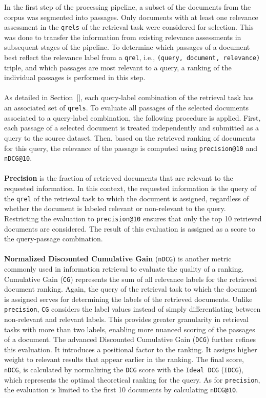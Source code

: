 In the first step of the processing pipeline, a subset of the documents from the corpus was segmented into passages. Only documents with at least one relevance assessment in the \texttt{qrels} of the retrieval task were considered for selection. This was done to transfer the information from existing relevance assessments in subsequent stages of the pipeline. To determine which passages of a document best reflect the relevance label from a \texttt{qrel}, i.e., \texttt{(query, document, relevance)} triple, and which passages are most relevant to a query, a ranking of the individual passages is performed in this step.
\\\\
As detailed in Section~[], each query-label combination of the retrieval task has an associated set of \texttt{qrels}. To evaluate all passages of the selected documents associated to a query-label combination, the following procedure is applied. First, each passage of a selected document is treated independently and submitted as a query to the source dataset. Then, based on the retrieved ranking of documents for this query, the relevance of the passage is computed using \texttt{precision@10} and \texttt{nDCG@10}.
\\\\
\textbf{Precision} is the fraction of retrieved documents that are relevant to the requested information. In this context, the requested information is the query of the \texttt{qrel} of the retrieval task to which the document is assigned, regardless of whether the document is labeled relevant or non-relevant to the query. Restricting the evaluation to \texttt{precision@10} ensures that only the top 10 retrieved documents are considered. The result of this evaluation is assigned as a score to the query-passage combination.
\\\\
\textbf{Normalized Discounted Cumulative Gain} (\texttt{nDCG}) is another metric commonly used in information retrieval to evaluate the quality of a ranking. Cumulative Gain (\texttt{CG}) represents the sum of all relevance labels for the retrieved document ranking. Again, the query of the retrieval task to which the document is assigned serves for determining the labels of the retrieved documents. Unlike \texttt{precision}, \texttt{CG} considers the label values instead of simply differentiating between non-relevant and relevant labels. This provides greater granularity in retrieval tasks with more than two labels, enabling more nuanced scoring of the passages of a document. The advanced Discounted Cumulative Gain (\texttt{DCG}) further refines this evaluation. It introduces a positional factor to the ranking. It assigns higher weight to relevant results that appear earlier in the ranking. The final score, \texttt{nDCG}, is calculated by normalizing the \texttt{DCG} score with the \texttt{Ideal DCG} (\texttt{IDCG}), which represents the optimal theoretical ranking for the query. As for \texttt{precision}, the evaluation is limited to the first 10 documents by calculating \texttt{nDCG@10}.
